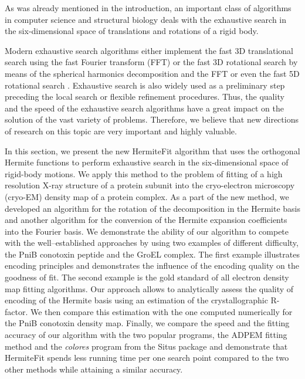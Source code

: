 As was already mentioned in the introduction, an important class of algorithms in computer science and structural biology deals with the exhaustive search in the 
six-dimensional space of translations and rotations of a rigid body. 

Modern exhaustive search algorithms either implement the fast 3D translational
search using the fast Fourier transform (FFT) \cite{Chacon2002,Katchalski-Katzir1992,Gabb1997,Wriggers2010,Siebert2009}
or the fast 3D rotational search by means of the spherical harmonics decomposition
and the FFT \cite{Kovacs2002} or even the fast 5D rotational search \cite{Kovacs2003,ritchie2008accelerating}.
Exhaustive search is also widely used as a preliminary step preceding the
local search or flexible refinement procedures. Thus, the quality
and the speed of the exhaustive search algorithms have a great impact on
the solution of the vast variety of problems. Therefore, we believe that new directions
of research on this topic are very important and highly valuable. 

In this section, we present the new HermiteFit algorithm that uses the orthogonal Hermite functions to perform exhaustive search in the 
six-dimensional space of rigid-body motions.
We apply this method to the problem of fitting of a high resolution X-ray structure of a protein subunit into the 
cryo-electron microscopy (cryo-EM) density map of a protein complex.
As a part of the new method, we developed an algorithm for the rotation of the decomposition in the Hermite basis and another algorithm for the conversion of
the Hermite expansion coefficients into the Fourier basis.
We demonstrate the ability of our algorithm to compete with the well--established approaches by using two examples of different difficulty, 
the PniB conotoxin peptide and the GroEL complex. 
%
The first example illustrates encoding principles and demonstrates the influence of the encoding quality on the goodness of  fit. 
%
The second example is the gold standard of all electron density map fitting 
algorithms. 
%
Our approach allows to analytically assess the quality of encoding of the Hermite basis using an estimation of the crystallographic R-factor. 
We then compare this estimation with the one computed numerically for the PniB conotoxin density map.
%
Finally, we compare the speed and the fitting accuracy of our algorithm with the two popular programs, the ADP\underline{\hspace*{0.2cm}}EM fitting method and the {\em colores} program from the 
Situs package and demonstrate that HermiteFit spends less running time per one search point compared to the two other methods while attaining a similar accuracy.

